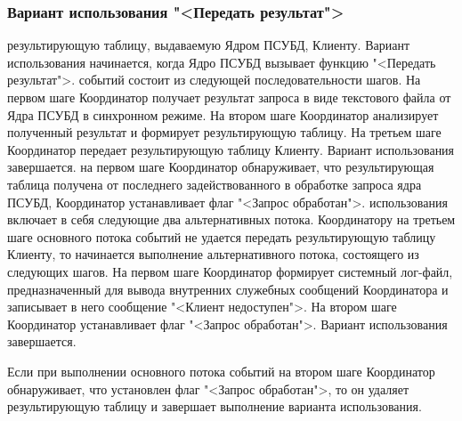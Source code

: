 \documentclass[11pt,oneside]{article}
\begin{document}
	\subsubsection{Вариант использования "<Передать результат">}
	 результирующую таблицу, выдаваемую Ядром ПСУБД, Клиенту. Вариант использования начинается, когда Ядро ПСУБД вызывает функцию "<Передать результат">.
	 событий состоит из следующей последовательности шагов. На первом шаге Координатор получает результат запроса в виде текстового файла от Ядра ПСУБД в синхронном режиме. На втором шаге Координатор анализирует полученный результат и формирует результирующую таблицу. На третьем шаге Координатор передает результирующую таблицу Клиенту. Вариант использования завершается.
	 на первом шаге Координатор обнаруживает, что результирующая таблица получена от последнего задействованного в обработке запроса ядра ПСУБД, Координатор устанавливает флаг "<Запрос обработан">.
	 использования включает в себя следующие два альтернативных потока.
	 Координатору на третьем шаге основного потока событий не удается передать результирующую таблицу Клиенту, то начинается выполнение альтернативного потока, состоящего из следующих шагов. На первом шаге Координатор формирует системный лог-файл, предназначенный для вывода внутренних служебных сообщений Координатора и записывает в него сообщение "<Клиент недоступен">. На втором шаге Координатор устанавливает флаг "<Запрос обработан">. Вариант использования завершается.
	\par Если при выполнении основного потока событий на втором шаге Координатор обнаруживает, что установлен флаг "<Запрос обработан">, то он удаляет результирующую таблицу и завершает выполнение варианта использования.
	
\end{document}
